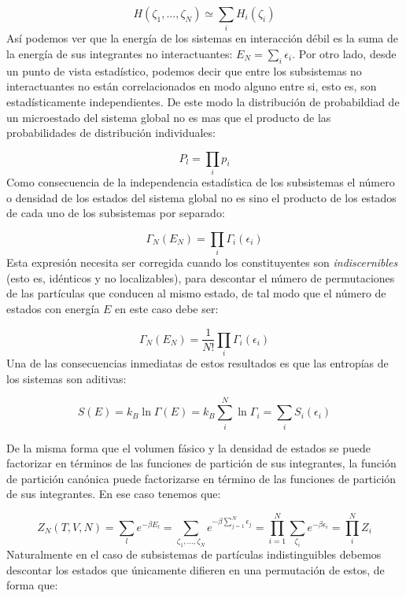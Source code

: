 \documentclass[12pt,a4paper]{article}
\numberwithin{equation}{section}
\numberwithin{figure}{section}
\theoremstyle{definition}
\begin{document}
\begin{equation}
H ( \zeta_1,...,\zeta_N) \simeq \sum_i H_i (\zeta_i)
\end{equation}
Así podemos ver que la energía de los sistemas en interacción débil es la suma de la energía de sus integrantes no interactuantes: $E_N = \sum_i \epsilon_i$. Por otro lado, desde un punto de vista estadístico, podemos decir que entre los subsistemas no interactuantes no están correlacionados en modo alguno entre si, esto es, son estadísticamente independientes. De este modo la distribución de probabildiad de un microestado del sistema global no es mas que el producto de las probabilidades de distribución individuales:

\begin{equation}
P_l = \prod_i p_i
\end{equation}
Como consecuencia de la independencia estadística de los subsistemas el número o densidad de los estados del sistema global no es sino el producto de los estados de cada uno de los subsistemas por separado:

\begin{equation}
\Gamma_N (E_N) = \prod_i \Gamma_i (\epsilon_i)
\end{equation}
Esta expresión necesita ser corregida cuando los constituyentes son \textit{indiscernibles} (esto es, idénticos y no localizables), para descontar el número de permutaciones de las partículas que conducen al mismo estado, de tal modo que el número de estados con energía $E$ en este caso debe ser:

\begin{equation}
\Gamma_N (E_N) = \frac{1}{N!} \prod_i \Gamma_i (\epsilon_i)
\end{equation}
Una de las consecuencias inmediatas de estos resultados es que las entropías de los sistemas son aditivas:

\begin{equation}
S(E) = k_B \ln \Gamma (E) = k_B \sum_i^N \ln \Gamma_i = \sum_i S_i(\epsilon_i)
\end{equation}

De la misma forma que el volumen fásico y la densidad de estados se puede factorizar en términos de las funciones de partición de sus integrantes, la función de partición canónica puede factorizarse en término de las funciones de partición de sus integrantes. En ese caso tenemos que:

\begin{equation}
Z_N (T,V,N) = \sum_l e^{- \beta E_l}  = \sum_{\zeta_1,...,\zeta_N} e^{-\beta \sum_{j=1}^N \epsilon_j} = \prod_{i=1}^N \sum_{\zeta_i} e^{-\beta \epsilon_i} = \prod_i^N Z_i
\end{equation}
Naturalmente en el caso de subsistemas de partículas indistinguibles debemos descontar los estados que únicamente difieren en una permutación de estos, de forma que:
\end{document}
